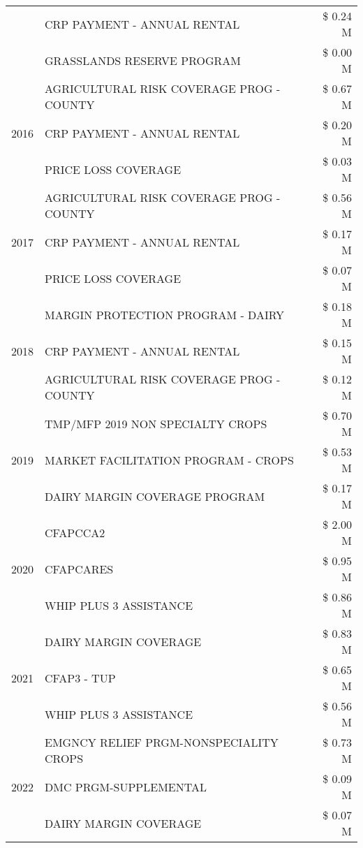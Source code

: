 \begin{tabular}{llr}
 & CRP PAYMENT - ANNUAL RENTAL & \$ 0.24 M \\
 & GRASSLANDS RESERVE PROGRAM & \$ 0.00 M \\
\cline{1-3}
\multirow[t]{3}{*}{2016} & AGRICULTURAL RISK COVERAGE PROG - COUNTY & \$ 0.67 M \\
 & CRP PAYMENT - ANNUAL RENTAL & \$ 0.20 M \\
 & PRICE LOSS COVERAGE & \$ 0.03 M \\
\cline{1-3}
\multirow[t]{3}{*}{2017} & AGRICULTURAL RISK COVERAGE PROG - COUNTY & \$ 0.56 M \\
 & CRP PAYMENT - ANNUAL RENTAL & \$ 0.17 M \\
 & PRICE LOSS COVERAGE & \$ 0.07 M \\
\cline{1-3}
\multirow[t]{3}{*}{2018} & MARGIN PROTECTION PROGRAM - DAIRY & \$ 0.18 M \\
 & CRP PAYMENT - ANNUAL RENTAL & \$ 0.15 M \\
 & AGRICULTURAL RISK COVERAGE PROG - COUNTY & \$ 0.12 M \\
\cline{1-3}
\multirow[t]{3}{*}{2019} & TMP/MFP 2019 NON SPECIALTY CROPS & \$ 0.70 M \\
 & MARKET FACILITATION PROGRAM - CROPS & \$ 0.53 M \\
 & DAIRY MARGIN COVERAGE PROGRAM & \$ 0.17 M \\
\cline{1-3}
\multirow[t]{3}{*}{2020} & CFAPCCA2 & \$ 2.00 M \\
 & CFAPCARES & \$ 0.95 M \\
 & WHIP PLUS 3 ASSISTANCE & \$ 0.86 M \\
\cline{1-3}
\multirow[t]{3}{*}{2021} & DAIRY MARGIN COVERAGE & \$ 0.83 M \\
 & CFAP3 - TUP & \$ 0.65 M \\
 & WHIP PLUS 3 ASSISTANCE & \$ 0.56 M \\
\cline{1-3}
\multirow[t]{3}{*}{2022} & EMGNCY RELIEF PRGM-NONSPECIALITY CROPS & \$ 0.73 M \\
 & DMC PRGM-SUPPLEMENTAL & \$ 0.09 M \\
 & DAIRY MARGIN COVERAGE & \$ 0.07 M \\
\cline{1-3}
\bottomrule
\end{tabular}
